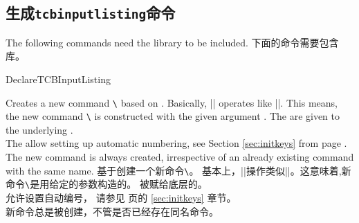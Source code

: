 \subsection{生成\texttt{tcbinputlisting}命令}\label{subsec:xparse_inputlisting}
\begin{marker}
\begin{stripedbox}
The following commands need the  library to be included.
\tcblower
下面的命令需要包含库。
\end{stripedbox}
\end{marker}


\begin{docCommand}{DeclareTCBInputListing}{}
\begin{stripedbox}
Creates a new command \texttt{\textbackslash} based on .
Basically, |\DeclareTCBInputListing| operates like |\DeclareDocumentCommand|. This means,
the new command \texttt{\textbackslash} is constructed with the given argument .
The  are given to the underlying .\\
The  allow setting up automatic numbering,
see Section \ref{sec:initkeys} from page \pageref{sec:initkeys}.\\
The new command is always created, irrespective of an already existing
command with the same name.
\tcblower
基于创建一个新命令\texttt{\textbackslash}。%
基本上，|\DeclareTCBInputListing|操作类似|\DeclareDocumentCommand|。这意味着,新命令\texttt{\textbackslash}是用给定的参数构造的。%
被赋给底层的。\\%
允许设置自动编号，
请参见 \pageref{sec:initkeys} 页的 \ref{sec:initkeys} 章节。\\
新命令总是被创建，不管是否已经存在同名命令。
\end{stripedbox}

\begin{dispExample}

\end{dispExample}
  \end{docCommand}

